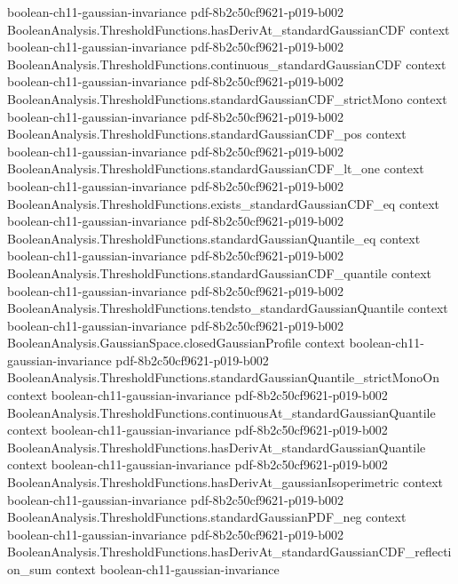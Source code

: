 \begin{lemma}
  {boolean-ch11-gaussian-invariance}
  {pdf-8b2c50cf9621-p019-b002}
\proofstep
  {BooleanAnalysis.ThresholdFunctions.hasDerivAt_standardGaussianCDF}
  {context}
  {boolean-ch11-gaussian-invariance}
  {pdf-8b2c50cf9621-p019-b002}
\proofstep
  {BooleanAnalysis.ThresholdFunctions.continuous_standardGaussianCDF}
  {context}
  {boolean-ch11-gaussian-invariance}
  {pdf-8b2c50cf9621-p019-b002}
\proofstep
  {BooleanAnalysis.ThresholdFunctions.standardGaussianCDF_strictMono}
  {context}
  {boolean-ch11-gaussian-invariance}
  {pdf-8b2c50cf9621-p019-b002}
\proofstep
  {BooleanAnalysis.ThresholdFunctions.standardGaussianCDF_pos}
  {context}
  {boolean-ch11-gaussian-invariance}
  {pdf-8b2c50cf9621-p019-b002}
\proofstep
  {BooleanAnalysis.ThresholdFunctions.standardGaussianCDF_lt_one}
  {context}
  {boolean-ch11-gaussian-invariance}
  {pdf-8b2c50cf9621-p019-b002}
\proofstep
  {BooleanAnalysis.ThresholdFunctions.exists_standardGaussianCDF_eq}
  {context}
  {boolean-ch11-gaussian-invariance}
  {pdf-8b2c50cf9621-p019-b002}
\proofstep
  {BooleanAnalysis.ThresholdFunctions.standardGaussianQuantile_eq}
  {context}
  {boolean-ch11-gaussian-invariance}
  {pdf-8b2c50cf9621-p019-b002}
\proofstep
  {BooleanAnalysis.ThresholdFunctions.standardGaussianCDF_quantile}
  {context}
  {boolean-ch11-gaussian-invariance}
  {pdf-8b2c50cf9621-p019-b002}
\proofstep
  {BooleanAnalysis.ThresholdFunctions.tendsto_standardGaussianQuantile}
  {context}
  {boolean-ch11-gaussian-invariance}
  {pdf-8b2c50cf9621-p019-b002}
\proofstep
  {BooleanAnalysis.GaussianSpace.closedGaussianProfile}
  {context}
  {boolean-ch11-gaussian-invariance}
  {pdf-8b2c50cf9621-p019-b002}
\proofstep
  {BooleanAnalysis.ThresholdFunctions.standardGaussianQuantile_strictMonoOn}
  {context}
  {boolean-ch11-gaussian-invariance}
  {pdf-8b2c50cf9621-p019-b002}
\proofstep
  {BooleanAnalysis.ThresholdFunctions.continuousAt_standardGaussianQuantile}
  {context}
  {boolean-ch11-gaussian-invariance}
  {pdf-8b2c50cf9621-p019-b002}
\proofstep
  {BooleanAnalysis.ThresholdFunctions.hasDerivAt_standardGaussianQuantile}
  {context}
  {boolean-ch11-gaussian-invariance}
  {pdf-8b2c50cf9621-p019-b002}
\proofstep
  {BooleanAnalysis.ThresholdFunctions.hasDerivAt_gaussianIsoperimetric}
  {context}
  {boolean-ch11-gaussian-invariance}
  {pdf-8b2c50cf9621-p019-b002}
\proofstep
  {BooleanAnalysis.ThresholdFunctions.standardGaussianPDF_neg}
  {context}
  {boolean-ch11-gaussian-invariance}
  {pdf-8b2c50cf9621-p019-b002}
\proofstep
  {BooleanAnalysis.ThresholdFunctions.hasDerivAt_standardGaussianCDF_reflection_sum}
  {context}
  {boolean-ch11-gaussian-invariance}

\end{lemma}
